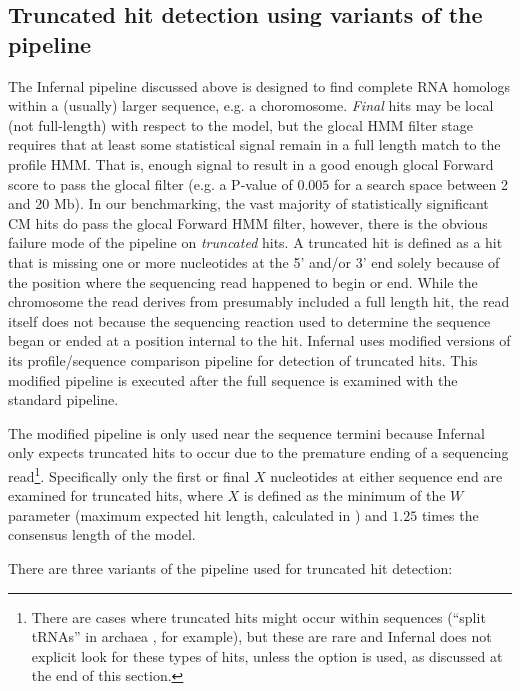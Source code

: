 \subsection{Truncated hit detection using variants of the pipeline}

The Infernal pipeline discussed above is designed to find complete RNA
homologs within a (usually) larger sequence, e.g. a choromosome.
\emph{Final} hits may be local (not full-length) with respect to the
model, but the glocal HMM filter stage requires that at least some
statistical signal remain in a full length match to the profile
HMM. That is, enough signal to result in a good enough glocal Forward
score to pass the glocal filter (e.g. a P-value of $0.005$ for a
search space between 2 and 20 Mb). In our benchmarking, the vast
majority of statistically significant CM hits do pass the glocal
Forward HMM filter, however, there is the obvious failure mode of the
pipeline on \emph{truncated} hits. A truncated hit is defined as a hit
that is missing one or more nucleotides at the 5' and/or 3' end solely
because of the position where the sequencing read happened to begin or
end. While the chromosome the read derives from presumably included a
full length hit, the read itself does not because the sequencing
reaction used to determine the sequence began or ended at a position
internal to the hit. Infernal uses modified versions of its
profile/sequence comparison pipeline for detection of truncated hits.
This modified pipeline is executed after the full sequence is examined
with the standard pipeline.

The modified pipeline is only used near the sequence termini because
Infernal only expects truncated hits to occur due to the premature
ending of a sequencing read\footnote{There are cases where truncated
hits might occur within sequences (``split tRNAs'' in archaea
\citep{Randau05}, for example), but these are rare and Infernal does
not explicit look for these types of hits, unless the
 option is used, as discussed at the end of this
section.}. Specifically only the first or final $X$ nucleotides at
either sequence end are examined for truncated hits, where $X$ is
defined as the minimum of the $W$ parameter (maximum expected hit
length, calculated in ) and $1.25$ times the consensus
length of the model.

There are three variants of the pipeline used for truncated hit
detection:

